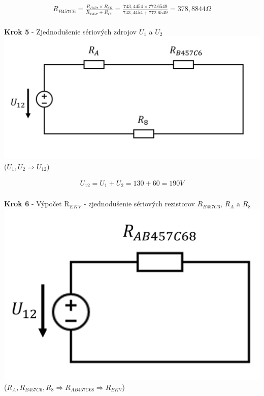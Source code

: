 \begin{gather*}
    R_{B457C6} = \frac{R_{B457} \times R_{C6}}{R_{B457} + R_{C6}} =
    \frac{743,4454 \times 772.6549}{743,4454 +772.6549} =
    378,8844 \Omega \\
\end{gather*}

\begin{center}
\textbf{Krok 5} - Zjednodušenie sériových zdrojov $U_1$ a $U_2$
\includegraphics[scale=0.7,keepaspectratio]{fig/c5.png} \\
($U_{1},U_{2} \Rightarrow U_{12}$)
\end{center}

\begin{gather*}
   U_{12} = U_{1} + U_{2} = 130 + 60 = 190 V \\
\end{gather*}

\begin{center}
\textbf{Krok 6} - Výpočet R$_E$$_K$$_V$ - zjednodušenie sériových rezistorov $R_{B457C6}$, $R_A$ a $R_8$
\\
\includegraphics[scale=0.8,keepaspectratio]{fig/c6.png} \\
($R_{A}, R_{B457C6}, R_{8} \Rightarrow R_{AB457C68} \Rightarrow R_{EKV}$)
\end{center}


